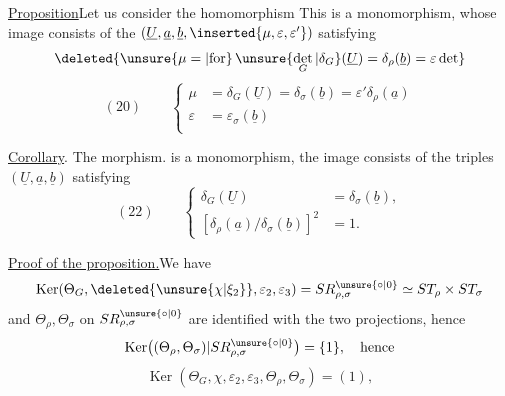 \uline{Proposition}\quad Let us consider the homomorphism
This is a monomorphism, whose image
consists of the 
$(\underline U,\underline a,\underline b,\inserted{\mu,\varepsilon,\varepsilon'})$
satisfying
\[
\deleted{\unsure{\mu=|\text{for}}\,
\unsure{\det_G|\delta_G}(\underline U)
=\delta_\rho(\underline b)=\varepsilon\det}
\]
\[
(20)\qquad\left\{\begin{aligned}
\mu&=\delta_G(\underline U)=\delta_\sigma(\underline b)
=\varepsilon'\delta_\rho(\underline a)\\
\varepsilon&=\varepsilon_\sigma(\underline b)\\[1ex]
\end{aligned}\right.
\]

\uline{Corollary}. The morphism.
is a monomorphism, the image consists of the triples
$(\underline U,\underline a,\underline b)$ satisfying
\[
(22)\qquad\left\{\begin{aligned}
\delta_G(\underline U)&=\delta_\sigma(\underline b),\\
[\delta_\rho(\underline a)/\delta_\sigma(\underline b)]^2&=1.
\end{aligned}\right.
\]

\uline{Proof of the proposition.}\quad We have
\[
\operatorname{Ker}(\Theta_G,\deleted{\unsure{\chi|\xi_2}},\varepsilon_2,\varepsilon_3)
=SR_{\rho,\sigma}^{\unsure{\circ|0}}\simeq ST_\rho\times ST_\sigma
\]
and $\Theta_\rho,\Theta_\sigma$ 
on $SR_{\rho,\sigma}^{\unsure{\circ|0}}$ are identified with the two projections,
hence \deleted{$\unsure{\Theta}$}
\[
\operatorname{Ker}\bigl((\Theta_\rho,\Theta_\sigma)|SR_{\rho,\sigma}^{\unsure{\circ|0}}\bigr)
=\{1\},\quad\text{hence}
\]
\[
\operatorname{Ker}(\Theta_G,\chi,\varepsilon_2,\varepsilon_3,\Theta_\rho,\Theta_\sigma)
=(1),
\]

